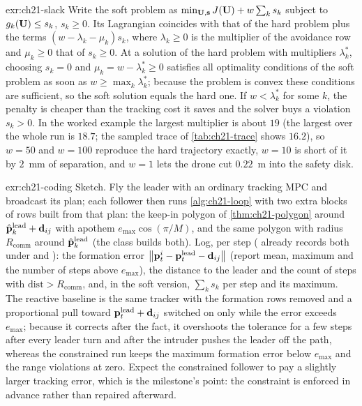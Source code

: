 \begin{solution}{exr:ch21-slack}
Write the soft problem as $\min_{\mathbf{U},\mathbf{s}}J(\mathbf{U})+w\sum_k s_k$ subject to $g_k(\mathbf{U})\le s_k$, $s_k\ge0$. Its Lagrangian coincides with that of the hard problem plus the terms $(w-\lambda_k-\mu_k)s_k$, where $\lambda_k\ge0$ is the multiplier of the avoidance row and $\mu_k\ge0$ that of $s_k\ge0$. At a solution of the hard problem with multipliers $\lambda_k^*$, choosing $s_k=0$ and $\mu_k=w-\lambda_k^*\ge0$ satisfies all optimality conditions of the soft problem as soon as $w\ge\max_k\lambda_k^*$; because the problem is convex these conditions are sufficient, so the soft solution equals the hard one. If $w<\lambda_k^*$ for some $k$, the penalty is cheaper than the tracking cost it saves and the solver buys a violation $s_k>0$. In the worked example the largest multiplier is about $19$ (the largest over the whole run is $18.7$; the sampled trace of \cref{tab:ch21-trace} shows $16.2$), so $w=50$ and $w=100$ reproduce the hard trajectory exactly, $w=10$ is short of it by $2$~mm of separation, and $w=1$ lets the drone cut $0.22$~m into the safety disk.
\end{solution}
\begin{solution}{exr:ch21-coding}
Sketch. Fly the leader with an ordinary tracking MPC and broadcast its plan; each follower then runs \cref{alg:ch21-loop} with two extra blocks of rows built from that plan: the keep-in polygon of \cref{thm:ch21-polygon} around $\hat{\mathbf{p}}^{\mathrm{lead}}_k+\mathbf{d}_{ij}$ with apothem $e_{\max}\cos(\pi/M)$, and the same polygon with radius $R_{\mathrm{comm}}$ around $\hat{\mathbf{p}}^{\mathrm{lead}}_k$ (the class  builds both). Log, per step ( already records both under  and ): the formation error $\left\lVert \mathbf{p}^i_t-\mathbf{p}^{\mathrm{lead}}_t-\mathbf{d}_{ij} \right\rVert$ (report mean, maximum and the number of steps above $e_{\max}$), the distance to the leader and the count of steps with $\mathrm{dist}>R_{\mathrm{comm}}$, and, in the soft version, $\sum_k s_k$ per step and its maximum. The reactive baseline is the same tracker with the formation rows removed and a proportional pull toward $\mathbf{p}^{\mathrm{lead}}_t+\mathbf{d}_{ij}$ switched on only while the error exceeds $e_{\max}$; because it corrects after the fact, it overshoots the tolerance for a few steps after every leader turn and after the intruder pushes the leader off the path, whereas the constrained run keeps the maximum formation error below $e_{\max}$ and the range violations at zero. Expect the constrained follower to pay a slightly larger tracking error, which is the milestone's point: the constraint is enforced in advance rather than repaired afterward.
\end{solution}
